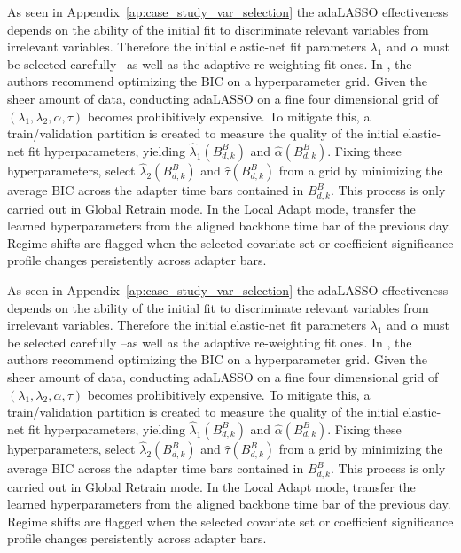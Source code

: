 \documentclass{rQUF2e}
\theoremstyle{plain}
\theoremstyle{definition}
\theoremstyle{remark}
\begin{document}
As seen in Appendix~\ref{ap:case_study_var_selection} the adaLASSO effectiveness depends on the ability of the initial fit to discriminate relevant variables from irrelevant variables. Therefore the initial elastic-net fit parameters \(\lambda_1\) and \(\alpha\) must be selected carefully --as well as the adaptive re-weighting fit ones. In \citet{MEDEIROS2016255}, the authors recommend optimizing the BIC on a hyperparameter grid. Given the sheer amount of data, conducting adaLASSO on a fine four dimensional grid of \((\lambda_1, \lambda_2, \alpha, \tau)\) becomes prohibitively expensive. To mitigate this, a train/validation partition is created to measure the quality of the initial elastic-net fit hyperparameters, yielding  \(\hat{\lambda}_1 \left( B^B_{d, k} \right)\) and \(\hat{\alpha}\left( B^B_{d, k} \right)\). Fixing these hyperparameters, select \(\hat{\lambda}_2\left( B^B_{d, k} \right)\) and \(\hat{\tau}\left( B^B_{d,k} \right)\) from a grid by minimizing the average BIC across the adapter time bars contained in \(B^B_{d,k}\). This process is only carried out in Global Retrain mode. In the Local Adapt mode, transfer the learned hyperparameters from the aligned backbone time bar of the previous day. Regime shifts are flagged when the selected covariate set or coefficient significance profile changes persistently across adapter bars.

As seen in Appendix~\ref{ap:case_study_var_selection} the adaLASSO effectiveness depends on the ability of the initial fit to discriminate relevant variables from irrelevant variables. Therefore the initial elastic-net fit parameters \(\lambda_1\) and \(\alpha\) must be selected carefully --as well as the adaptive re-weighting fit ones. In \citet{MEDEIROS2016255}, the authors recommend optimizing the BIC on a hyperparameter grid. Given the sheer amount of data, conducting adaLASSO on a fine four dimensional grid of \((\lambda_1, \lambda_2, \alpha, \tau)\) becomes prohibitively expensive. To mitigate this, a train/validation partition is created to measure the quality of the initial elastic-net fit hyperparameters, yielding  \(\hat{\lambda}_1 \left( B^B_{d, k} \right)\) and \(\hat{\alpha}\left( B^B_{d, k} \right)\). Fixing these hyperparameters, select \(\hat{\lambda}_2\left( B^B_{d, k} \right)\) and \(\hat{\tau}\left( B^B_{d,k} \right)\) from a grid by minimizing the average BIC across the adapter time bars contained in \(B^B_{d,k}\). This process is only carried out in Global Retrain mode. In the Local Adapt mode, transfer the learned hyperparameters from the aligned backbone time bar of the previous day. Regime shifts are flagged when the selected covariate set or coefficient significance profile changes persistently across adapter bars.
\end{document}
